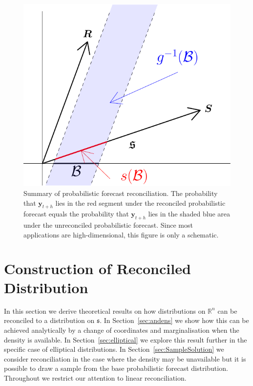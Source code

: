 \documentclass[a4paper,12pt]{article}
\theoremstyle{definition}
\begin{document}
\begin{figure}[!htb]
	\centering \includegraphics[height=0.3\textheight]{Figs/probforerec_schematic.pdf}
	\caption{Summary of probabilistic forecast reconciliation. The probability that $\bm{y}_{t+h}$ lies in the red segment under the reconciled probabilistic forecast equals the probability that $\bm{y}_{t+h}$ lies in the shaded blue area under the unreconciled probabilistic forecast. Since most applications are high-dimensional, this figure is only a schematic.}\label{fig:probfr_sch}
\end{figure}


\section{Construction of Reconciled Distribution} \label{sec:AnalyticalSolution}

In this section we derive theoretical results on how distributions on $\mathbb{R}^n$ can be reconciled to a distribution on $\mathfrak{s}$. In Section~\ref{sec:andens} we show how this can be achieved analytically by a change of coordinates and marginalisation when the density is available. In Section~\ref{sec:elliptical} we explore this result further in the specific case of elliptical distributions. In Section~\ref{sec:SampleSolution} we consider reconciliation in the case where the density may be unavailable but it is possible to draw a sample from the base probabilistic forecast distribution. Throughout we restrict our attention to linear reconciliation.
\end{document}
